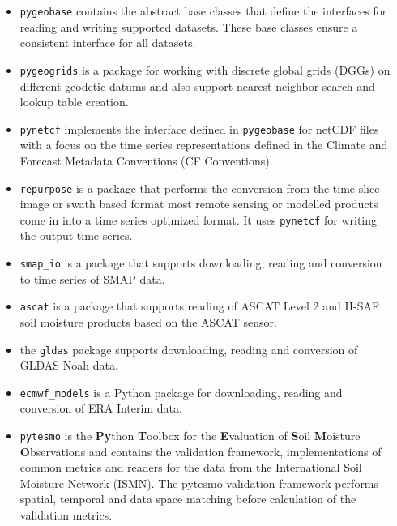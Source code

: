 \documentclass[20pt, a0paper, portrait]{tikzposter}
\newcommand{\code}[1]{\colorbox{light-gray}{\texttt{#1}}}
\begin{document}
\begin{columns}
{     \begin{itemize}
     \item \code{pygeobase} contains the abstract base classes that define the
       interfaces for reading and writing supported datasets. These base classes
       ensure a consistent interface for all datasets.
     \item \code{pygeogrids} is a package for working with discrete global grids
       (DGGs) on different geodetic datums and also support nearest neighbor
       search and lookup table creation.
     \item \code{pynetcf} implements the interface defined in \code{pygeobase}
       for netCDF files with a focus on the time series representations defined
       in the Climate and Forecast Metadata Conventions (CF Conventions).
     \item \code{repurpose} is a package that performs the conversion from the
       time-slice image or swath based format most remote sensing or modelled
       products come in into a time series optimized format. It uses
       \code{pynetcf} for writing the output time series.
     \item \code{smap\_io} is a package that supports downloading, reading and
       conversion to time series of SMAP data.
     \item \code{ascat} is a package that supports reading of ASCAT Level 2 and
       H-SAF soil moisture products based on the ASCAT sensor.
     \item the \code{gldas} package supports downloading, reading and conversion
       of GLDAS Noah data.
     \item \code{ecmwf\_models} is a Python package for downloading, reading and
       conversion of ERA Interim data.
     \item \code{pytesmo} is the \textbf{Py}thon \textbf{T}oolbox for the
       \textbf{E}valuation of \textbf{S}oil \textbf{M}oisture
       \textbf{O}bservations and contains the validation framework,
       implementations of common metrics and readers for the data from the
       International Soil Moisture Network (ISMN). The pytesmo validation
       framework performs spatial, temporal and data space matching before
       calculation of the validation metrics.
     \end{itemize} 


  }

  \begin{subcolumns}



\end{subcolumns}
\end{columns}
\end{document}
